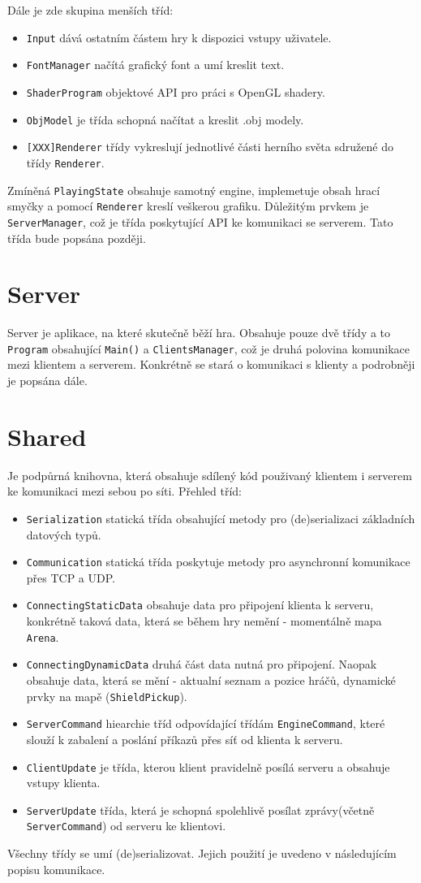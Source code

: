 \documentclass[a4paper,hidelinks]{report}
\begin{document}
Dále je zde skupina menších tříd:
\begin{itemize}
	\item \texttt{Input} dává ostatním částem hry k dispozici vstupy uživatele.
	\item \texttt{FontManager} načítá grafický font a umí kreslit text.
	\item \texttt{ShaderProgram} objektové API pro práci s OpenGL shadery.
	\item \texttt{ObjModel} je třída schopná načítat a kreslit .obj modely.
	\item \texttt{[XXX]Renderer} třídy vykreslují jednotlivé části herního světa sdružené do třídy \texttt{Renderer}.
\end{itemize}

Zmíněná \texttt{PlayingState} obsahuje samotný engine, implemetuje obsah hrací smyčky a pomocí \texttt{Renderer} kreslí veškerou grafiku. Důležitým prvkem je \texttt{ServerManager}, což je třída poskytující API ke komunikaci se serverem.
Tato třída bude popsána později.
\section{Server}
Server je aplikace, na které skutečně běží hra. Obsahuje pouze dvě třídy a to \texttt{Program} obsahující \texttt{Main()} a \texttt{ClientsManager}, což je druhá polovina komunikace mezi klientem a serverem. Konkrétně se stará o komunikaci s klienty a podrobněji je popsána dále.
\section{Shared}
Je podpůrná knihovna, která obsahuje sdílený kód použivaný klientem i serverem ke komunikaci mezi sebou po síti. Přehled tříd:
\begin{itemize}
	\item \texttt{Serialization} statická třída obsahující metody pro (de)serializaci základních datových typů.
	\item \texttt{Communication} statická třída poskytuje metody pro asynchronní komunikace přes TCP a UDP.
	\item \texttt{ConnectingStaticData} obsahuje data pro připojení klienta k serveru, konkrétně taková data, která se během hry nemění - momentálně mapa  \texttt{Arena}.
	\item \texttt{ConnectingDynamicData} druhá část data nutná pro připojení. Naopak obsahuje data, která se mění - aktualní seznam a pozice hráčů, dynamické prvky na mapě (\texttt{ShieldPickup}).
	\item \texttt{ServerCommand} hiearchie tříd odpovídající třídám \texttt{EngineCommand}, které slouží k zabalení a poslání příkazů přes síť od klienta k serveru.
	\item \texttt{ClientUpdate} je třída, kterou klient pravidelně posílá serveru a obsahuje vstupy klienta.
	\item \texttt{ServerUpdate} třída, která je schopná spolehlivě posílat zprávy(včetně \texttt{ServerCommand}) od serveru ke klientovi.
\end{itemize}
Všechny třídy se umí (de)serializovat. Jejich použití je uvedeno v následujícím popisu komunikace.
\end{document}
